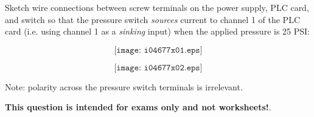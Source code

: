 

Sketch wire connections between screw terminals on the power supply, PLC card, and switch so that the pressure switch {\it sources} current to channel 1 of the PLC card (i.e. using channel 1 as a {\it sinking} input) when the applied pressure is 25 PSI:

$$\texttt{[image: i04677x01.eps]}$$







$$\texttt{[image: i04677x02.eps]}$$

Note: polarity across the pressure switch terminals is irrelevant.







{\bf This question is intended for exams only and not worksheets!}.


